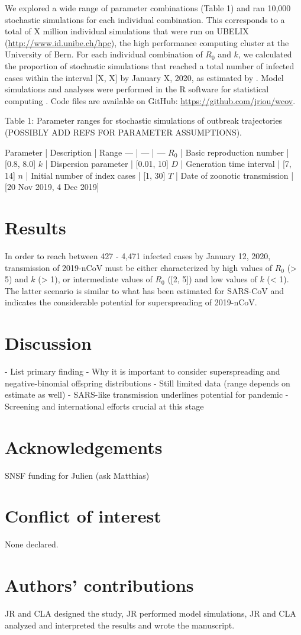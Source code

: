 \documentclass{article}
\begin{document}
We explored a wide range of parameter combinations (Table 1) and ran 10,000 stochastic simulations for each individual combination. This corresponds to a total of X million individual simulations that were run on UBELIX (\url{http://www.id.unibe.ch/hpc}), the high performance computing cluster at the University of Bern. For each individual combination of $R_0$ and $k$, we calculated the proportion of stochastic simulations that reached a total number of infected cases within the interval [X, X] by January X, 2020, as estimated by \citet{Imai:2020}. Model simulations and analyses were performed in the R software for statistical computing \citep{R:2018}. Code files are available on GitHub: \url{https://github.com/jriou/wcov}.

Table 1: Parameter ranges for stochastic simulations of outbreak trajectories (POSSIBLY ADD REFS FOR PARAMETER ASSUMPTIONS).

Parameter | Description | Range
--- | --- | ---
$R_0$ | Basic reproduction number | [0.8, 8.0]
$k$ | Dispersion parameter | [0.01, 10]
$D$ | Generation time interval | [7, 14]
$n$ | Initial number of index cases | [1, 30]
$T$ | Date of zoonotic transmission | [20 Nov 2019, 4 Dec 2019]

\section{Results}
In order to reach between 427 - 4,471 infected cases by January 12, 2020, transmission of 2019-nCoV must be either characterized by high values of $R_0$ (> 5) and $k$ (> 1), or intermediate values of $R_0$ ([2, 5]) and low values of $k$ (< 1). The latter scenario is similar to what has been estimated for SARS-CoV and indicates the considerable potential for superspreading of 2019-nCoV.

\section{Discussion}
- List primary finding
- Why it is important to consider superspreading and negative-binomial offspring distributions
- Still limited data (range depends on estimate as well)
- SARS-like transmission underlines potential for pandemic
- Screening and international efforts crucial at this stage

\cite{Lloyd-Smith:2005,Fraser:2011,Kucharski:2015b}

\section{Acknowledgements}
SNSF funding for Julien (ask Matthias)

\section{Conflict of interest}
None declared.

\section{Authors' contributions}

JR and CLA designed the study, JR performed model simulations, JR and CLA analyzed and interpreted the results and wrote the manuscript.


\end{document}
